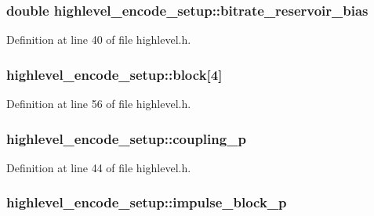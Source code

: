 \subsubsection[{\texorpdfstring{bitrate\+\_\+reservoir\+\_\+bias}{bitrate_reservoir_bias}}]{\setlength{\rightskip}{0pt plus 5cm}double highlevel\+\_\+encode\+\_\+setup\+::bitrate\+\_\+reservoir\+\_\+bias}\hypertarget{structhighlevel__encode__setup_a797b88513e6d903fa82509ebb3981e39}{}\label{structhighlevel__encode__setup_a797b88513e6d903fa82509ebb3981e39}


Definition at line 40 of file highlevel.\+h.

\subsubsection[{\texorpdfstring{block}{block}}]{ highlevel\+\_\+encode\+\_\+setup\+::block\mbox{[}4\mbox{]}}\hypertarget{structhighlevel__encode__setup_ab4c8b364012b7b4fa38d94ec17c645cd}{}\label{structhighlevel__encode__setup_ab4c8b364012b7b4fa38d94ec17c645cd}


Definition at line 56 of file highlevel.\+h.

\subsubsection[{\texorpdfstring{coupling\+\_\+p}{coupling_p}}]{ highlevel\+\_\+encode\+\_\+setup\+::coupling\+\_\+p}\hypertarget{structhighlevel__encode__setup_a6b1b3c1aba15cfd92834b950c682b036}{}\label{structhighlevel__encode__setup_a6b1b3c1aba15cfd92834b950c682b036}


Definition at line 44 of file highlevel.\+h.

\subsubsection[{\texorpdfstring{impulse\+\_\+block\+\_\+p}{impulse_block_p}}]{ highlevel\+\_\+encode\+\_\+setup\+::impulse\+\_\+block\+\_\+p}\hypertarget{structhighlevel__encode__setup_ab9526c19e5ba4e42bb9c82f19b25eb1f}{}\label{structhighlevel__encode__setup_ab9526c19e5ba4e42bb9c82f19b25eb1f}


